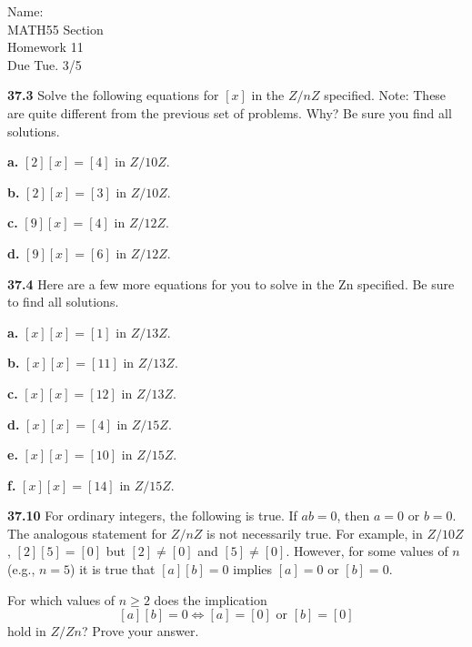 \documentclass[10pt]{article}
\begin{document}
\begin{flushright}
	Name: \underline{\hspace{3cm}} \\
	MATH55 Section \underline{\hspace{0.5cm}} \\
	Homework 11 \\
	Due Tue. 3/5
\end{flushright}


\begin{framed}
    \textbf{37.3} Solve the following equations for $[x]$ in the $Z/nZ$ specified.
    Note: These are quite different
    from the previous set of problems. Why?
    Be sure you find all solutions.

    \textbf{a.} $[2][x] = [4]$ in $Z/10Z$.

    \textbf{b.} $[2][x] = [3]$ in $Z/10Z$.

    \textbf{c.} $[9][x] = [4]$ in $Z/12Z$.

    \textbf{d.} $[9][x] = [6]$ in $Z/12Z$.
\end{framed}

\pagebreak

\begin{framed}
    \textbf{37.4} Here are a few more equations for you to solve in the Zn specified. 
    Be sure to find all solutions.

    \textbf{a.} $[x][x] = [1]$ in $Z/13Z$.

    \textbf{b.} $[x][x] = [11]$ in $Z/13Z$.

    \textbf{c.} $[x][x] = [12]$ in $Z/13Z$.

    \textbf{d.} $[x][x] = [4]$ in $Z/15Z$.

    \textbf{e.} $[x][x] = [10]$ in $Z/15Z$.

    \textbf{f.} $[x][x] = [14]$ in $Z/15Z$.
\end{framed}

\pagebreak

\begin{framed}
    \textbf{37.10} For ordinary integers, the following is true. 
    If $ab = 0$, then $a = 0$ or $b = 0$. The
    analogous statement for $Z/nZ$ is not necessarily true. 
    For example, in $Z/10Z$, $[2][5] = [0]$ but $[2] \neq [0]$ and 
    $[5] \neq [0]$. 
    However, for some values of $n$ (e.g., $n = 5$) it is true 
    that $[a][b] = 0$ implies $[a] = 0$ or $[b] = 0$.

    For which values of $n \geq 2$ does the implication
    $$
    [a][b] = 0 \Longleftrightarrow [a] = [0] \text{ or } [b] = [0]
    $$
    hold in $Z/Zn$?
    Prove your answer.
\end{framed}
\end{document}
